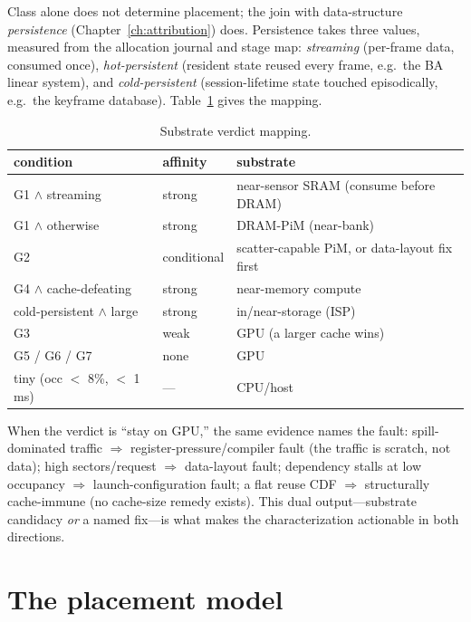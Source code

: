 Class alone does not determine placement; the join with data-structure
\emph{persistence} (Chapter~\ref{ch:attribution}) does. Persistence takes
three values, measured from the allocation journal and stage map:
\emph{streaming} (per-frame data, consumed once), \emph{hot-persistent}
(resident state reused every frame, e.g.\ the BA linear system), and
\emph{cold-persistent} (session-lifetime state touched episodically, e.g.\
the keyframe database). Table~\ref{tab:verdict} gives the mapping.

\begin{table}[t]
\centering
\caption{Substrate verdict mapping.}
\label{tab:verdict}
\begin{tabular}{@{}lll@{}}
\toprule
condition & affinity & substrate \\
\midrule
G1 $\wedge$ streaming & strong & near-sensor SRAM (consume before DRAM) \\
G1 $\wedge$ otherwise & strong & DRAM-PiM (near-bank) \\
G2 & conditional & scatter-capable PiM, or data-layout fix first \\
G4 $\wedge$ cache-defeating & strong & near-memory compute \\
cold-persistent $\wedge$ large & strong & in/near-storage (ISP) \\
G3 & weak & GPU (a larger cache wins) \\
G5 / G6 / G7 & none & GPU \\
tiny (occ $<$ 8\%, $<$ 1\,ms) & --- & CPU/host \\
\bottomrule
\end{tabular}
\end{table}

When the verdict is ``stay on GPU,'' the same evidence names the fault:
spill-dominated traffic $\Rightarrow$ register-pressure/compiler fault
(the traffic is scratch, not data); high sectors/request $\Rightarrow$
data-layout fault; dependency stalls at low occupancy $\Rightarrow$
launch-configuration fault; a flat reuse CDF $\Rightarrow$ structurally
cache-immune (no cache-size remedy exists). This dual output---substrate
candidacy \emph{or} a named fix---is what makes the characterization
actionable in both directions.

\section{The placement model}
\label{sec:met-model}

